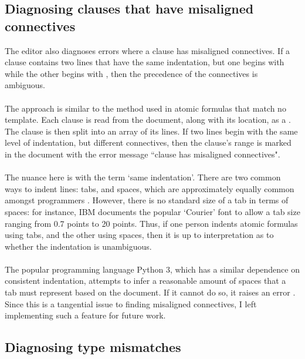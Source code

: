 \documentclass[../main.tex]{subfiles}
\begin{document}
\subsection{Diagnosing clauses that have misaligned connectives}
The editor also diagnoses errors where a clause has misaligned connectives. If a clause contains two lines that have the same indentation, but one begins with  while the other begins with , then the precedence of the connectives is ambiguous. 
\\
\\
The approach is similar to the method used in atomic formulas that match no template. Each clause is read from the document, along with its location, as a . The clause is then split into an array of its lines. If two lines begin with the same level of indentation, but different connectives, then the clause's range is marked in the document with the error message ``clause has misaligned connectives".
\\
\\
The nuance here is with the term `same indentation'. There are two common ways to indent lines: tabs, and spaces, which are approximately equally common amongst programmers \cite{tabs_vs_spaces}. However, there is no standard size of a tab in terms of spaces: for instance, IBM documents the popular `Courier' font to allow a tab size ranging from 0.7 points to 20 points. Thus, if one person indents atomic formulas using tabs, and the other using spaces, then it is up to interpretation as to whether the indentation is unambiguous.
\\
\\
The popular programming language Python 3, which has a similar dependence on consistent indentation, attempts to infer a reasonable amount of spaces that a tab must represent based on the document. If it cannot do so, it raises an error \cite{python_tabs_spaces}. Since this is a tangential issue to finding misaligned connectives, I left implementing such a feature for future work.

\subsection{Diagnosing type mismatches}
\end{document}
